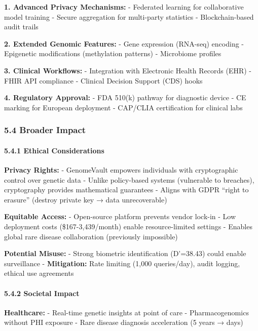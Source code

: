 \documentclass[
  11pt,
]{article}
\begin{document}
\textbf{1. Advanced Privacy Mechanisms:} - Federated learning for
collaborative model training - Secure aggregation for multi-party
statistics - Blockchain-based audit trails

\textbf{2. Extended Genomic Features:} - Gene expression (RNA-seq)
encoding - Epigenetic modifications (methylation patterns) - Microbiome
profiles

\textbf{3. Clinical Workflows:} - Integration with Electronic Health
Records (EHR) - FHIR API compliance - Clinical Decision Support (CDS)
hooks

\textbf{4. Regulatory Approval:} - FDA 510(k) pathway for diagnostic
device - CE marking for European deployment - CAP/CLIA certification for
clinical labs

\subsubsection{5.4 Broader Impact}\label{broader-impact}

\paragraph{5.4.1 Ethical Considerations}\label{ethical-considerations}

\textbf{Privacy Rights:} - GenomeVault empowers individuals with
cryptographic control over genetic data - Unlike policy-based systems
(vulnerable to breaches), cryptography provides mathematical guarantees
- Aligns with GDPR ``right to erasure'' (destroy private key → data
unrecoverable)

\textbf{Equitable Access:} - Open-source platform prevents vendor
lock-in - Low deployment costs (\$167-3,439/month) enable
resource-limited settings - Enables global rare disease collaboration
(previously impossible)

\textbf{Potential Misuse:} - Strong biometric identification (D'=38.43)
could enable surveillance - \textbf{Mitigation:} Rate limiting (1,000
queries/day), audit logging, ethical use agreements

\paragraph{5.4.2 Societal Impact}\label{societal-impact}

\textbf{Healthcare:} - Real-time genetic insights at point of care -
Pharmacogenomics without PHI exposure - Rare disease diagnosis
acceleration (5 years → days)
\end{document}
